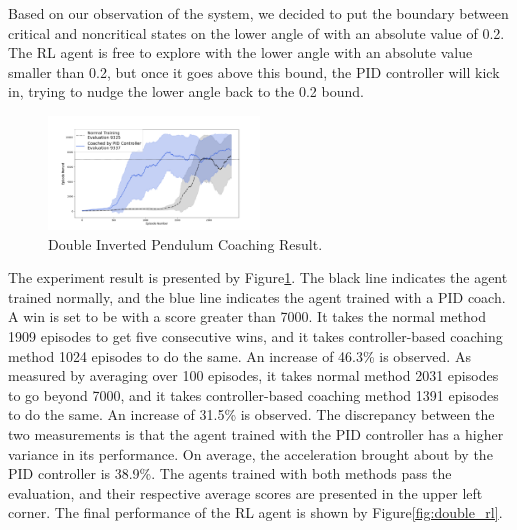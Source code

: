 \documentclass[smallextended]{svjour3}
\begin{document}
Based on our observation of the system, we decided to put the boundary between critical and noncritical states on the lower angle of with an absolute value of 0.2. The RL agent is free to explore with the lower angle with an absolute value smaller than 0.2, but once it goes above this bound, the PID controller will kick in, trying to nudge the lower angle back to the 0.2 bound.

\begin{figure}[H]
     \centering
      \includegraphics[width=0.5\textwidth]{double.png}
      \caption{Double Inverted Pendulum Coaching Result.}
      \label{fig:double_result}
\end{figure}

The experiment result is presented by Figure\ref{fig:double_result}. The black line indicates the agent trained normally, and the blue line indicates the agent trained with a PID coach. A win is set to be with a score greater than 7000. It takes the normal method 1909 episodes to get five consecutive wins, and it takes controller-based coaching method 1024 episodes to do the same. An increase of 46.3\% is observed. As measured by averaging over 100 episodes, it takes normal method 2031 episodes to go beyond 7000, and it takes controller-based coaching method 1391 episodes to do the same. An increase of 31.5\% is observed. The discrepancy between the two measurements is that the agent trained with the PID controller has a higher variance in its performance. On average, the acceleration brought about by the PID controller is 38.9\%. The agents trained with both methods pass the evaluation, and their respective average scores are presented in the upper left corner. The final performance of the RL agent is shown by Figure\ref{fig:double_rl}.
\end{document}
